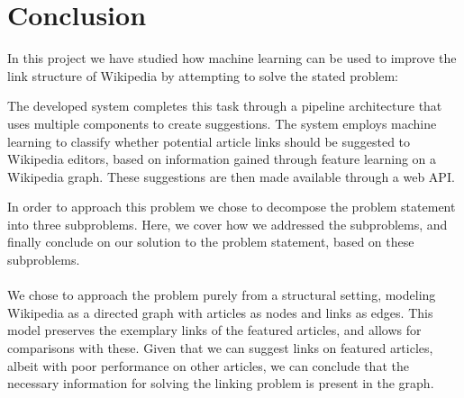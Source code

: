 \chapter{Conclusion}\label{chap:conclusion}
In this project we have studied how machine learning can be used to improve the link structure of Wikipedia by attempting to solve the stated problem:
\problemstatement

The developed system completes this task through a pipeline architecture that uses multiple components to create suggestions. The system employs machine learning to classify whether potential article links should be suggested to Wikipedia editors, based on information gained through feature learning on a Wikipedia graph. These suggestions are then made available through a web API\@.

In order to approach this problem we chose to decompose the problem statement into three subproblems. Here, we cover how we addressed the subproblems, and finally conclude on our solution to the problem statement, based on these subproblems.

\subsubsection*{\subproblemone}
We chose to approach the problem purely from a structural setting, modeling Wikipedia as a directed graph with articles as nodes and links as edges. This model preserves the exemplary links of the featured articles, and allows for comparisons with these. Given that we can suggest links on featured articles, albeit with poor performance on other articles, we can conclude that the necessary information for solving the linking problem is present in the graph.

